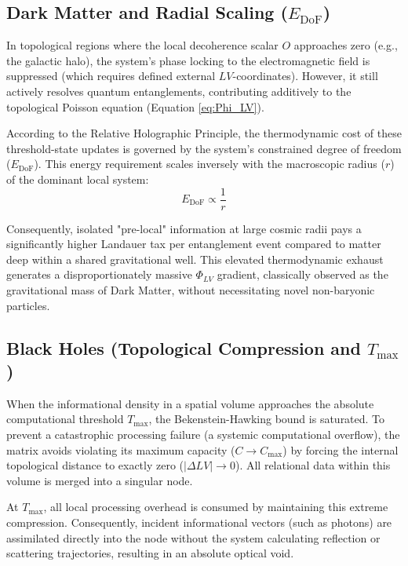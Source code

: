 \documentclass[12pt,a4paper]{article}
\begin{document}
\subsection{Dark Matter and Radial Scaling ($E_{\mathrm{DoF}}$)}
In topological regions where the local decoherence scalar $O$ approaches zero (e.g., the galactic halo), the system's phase locking to the electromagnetic field is suppressed (which requires defined external $LV$-coordinates). However, it still actively resolves quantum entanglements, contributing additively to the topological Poisson equation (Equation \ref{eq:Phi_LV}).

According to the Relative Holographic Principle, the thermodynamic cost of these threshold-state updates is governed by the system's constrained degree of freedom ($E_{\mathrm{DoF}}$). This energy requirement scales inversely with the macroscopic radius ($r$) of the dominant local system:
\begin{equation}
E_{\mathrm{DoF}} \propto \frac{1}{r}
\end{equation}

Consequently, isolated "pre-local" information at large cosmic radii pays a significantly higher Landauer tax per entanglement event compared to matter deep within a shared gravitational well. This elevated thermodynamic exhaust generates a disproportionately massive $\Phi_{LV}$ gradient, classically observed as the gravitational mass of Dark Matter, without necessitating novel non-baryonic particles.


\subsection{Black Holes (Topological Compression and $T_{\mathrm{max}}$)}
When the informational density in a spatial volume approaches the absolute computational threshold $T_{\mathrm{max}}$, the Bekenstein-Hawking bound is saturated. To prevent a catastrophic processing failure (a systemic computational overflow), the matrix avoids violating its maximum capacity ($C \to C_{\mathrm{max}}$) by forcing the internal topological distance to exactly zero ($|\Delta LV| \to 0$). All relational data within this volume is merged into a singular node. 

At $T_{\mathrm{max}}$, all local processing overhead is consumed by maintaining this extreme compression. Consequently, incident informational vectors (such as photons) are assimilated directly into the node without the system calculating reflection or scattering trajectories, resulting in an absolute optical void.
\end{document}
